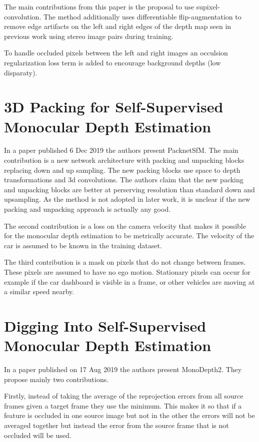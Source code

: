 The main contributions from this paper is the proposal to use supixel-convolution. The method additionally uses differentiable flip-augmentation to remove edge artifacts on the left and right edges of the depth map seen in previous work using stereo image pairs during training.

To handle occluded pixels between the left and right images an occulsion regularization loss term is added to encourage background depths (low disparaty).

\section{3D Packing for Self-Supervised Monocular Depth Estimation}
In a paper\cite{packnet} published 6 Dec 2019 the authors present PacknetSfM. The main contribution is a new network architecture with packing and unpacking blocks replacing down and up sampling. The new packing blocks use space to depth transformations and 3d convolutions. The authors claim that the new packing and unpacking blocks are better at perserving resolution than standard down and upsampling. As the method is not adopted in later work, it is unclear if the new packing and unpacking approach is actually any good.

The second contribution is a loss on the camera velocity that makes it possible for the monocular depth estimation to be metrically accurate. The velocity of the car is assumed to be known in the training dataset.

The third contribution is a mask on pixels that do not change between frames. These pixels are assumed to have no ego motion. Stationary pixels can occur for example if the car dashboard is visible in a frame, or other vehicles are moving at a similar speed nearby.

\section{Digging Into Self-Supervised Monocular Depth Estimation}
In a paper\cite{monodepth2} published on 17 Aug 2019 the authors present MonoDepth2. They propose mainly two contributions.

Firstly, instead of taking the average of the reprojection errors from all source frames given a target frame they use the minimum. This makes it so that if a feature is occluded in one source image but not in the other the errors will not be averaged together but instead the error from the source frame that is not occluded will be used.

